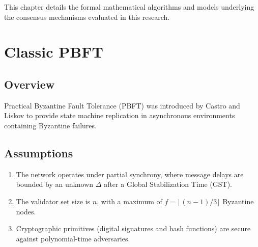 \documentclass[12pt, oneside, a4paper]{report}
\theoremstyle{definition}
\theoremstyle{remark}
\begin{document}
This chapter details the formal mathematical algorithms and models underlying the consensus mechanisms evaluated in this research.

\section{Classic PBFT}
\label{sec:cm:pbft}

\subsection{Overview}
Practical Byzantine Fault Tolerance (PBFT) was introduced by Castro and Liskov \cite{castro1999} to provide state machine replication in asynchronous environments containing Byzantine failures.

\subsection{Assumptions}
\begin{enumerate}
  \item The network operates under partial synchrony, where message delays are bounded by an unknown $\Delta$ after a Global Stabilization Time (GST).
  \item The validator set size is $n$, with a maximum of $f = \lfloor (n-1)/3 \rfloor$ Byzantine nodes.
  \item Cryptographic primitives (digital signatures and hash functions) are secure against polynomial-time adversaries.
\end{enumerate}
\end{document}
